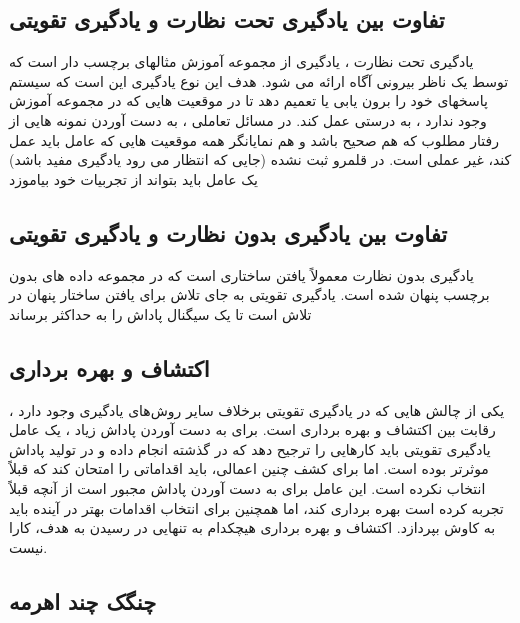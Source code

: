 \subsection{تفاوت بین یادگیری تحت نظارت و یادگیری تقویتی}
یادگیری تحت نظارت ، یادگیری از مجموعه آموزش مثالهای برچسب دار است که توسط یک ناظر بیرونی آگاه ارائه می شود. هدف این نوع یادگیری این است که سیستم پاسخهای خود را برون یابی یا تعمیم دهد تا در موقعیت هایی که در مجموعه آموزش وجود ندارد ، به درستی عمل کند. در مسائل تعاملی ، به دست آوردن نمونه هایی از رفتار مطلوب که هم صحیح باشد و هم نمایانگر همه موقعیت هایی که عامل باید عمل کند، غیر عملی است. در قلمرو ثبت نشده (جایی که انتظار می رود یادگیری مفید باشد) یک عامل باید بتواند از تجربیات خود بیاموزد

\subsection{تفاوت بین یادگیری بدون نظارت و یادگیری تقویتی}
یادگیری بدون نظارت معمولاً یافتن ساختاری است که در مجموعه داده های بدون برچسب پنهان شده است. یادگیری تقویتی به جای تلاش برای یافتن ساختار پنهان در تلاش است تا یک سیگنال پاداش را به حداکثر برساند

\subsection{اکتشاف و بهره برداری}
یکی از چالش هایی که در یادگیری تقویتی برخلاف سایر روش‌های یادگیری وجود دارد ، رقابت بین اکتشاف و بهره برداری است. برای به دست آوردن پاداش زیاد ، یک عامل یادگیری تقویتی باید کارهایی را ترجیح دهد که در گذشته انجام داده و در تولید پاداش موثرتر بوده است. اما برای کشف چنین اعمالی، باید اقداماتی را امتحان کند که قبلاً انتخاب نکرده است. این عامل برای به دست آوردن پاداش مجبور است از آنچه قبلاً تجربه کرده است بهره برداری کند، اما همچنین برای انتخاب اقدامات بهتر در آینده باید به کاوش بپردازد. 
اکتشاف و بهره برداری هیچکدام به تنهایی در رسیدن به هدف، کارا نیست.
\subsection{چنگک چند اهرمه}

